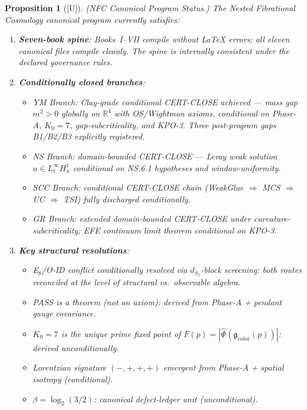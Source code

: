 \documentclass[12pt,oneside]{amsbook}
\theoremstyle{plain}
\newtheorem{proposition}[theorem]{Proposition}
\theoremstyle{definition}
\theoremstyle{remark}
\newcommand{\status}[1]{\textup{[#1]}}
\begin{document}
\begin{proposition}[\status{U}]\label{prop:program-status}
\textup{(NFC Canonical Program Status.)}
The Nested Fibrational Cosmology canonical program currently satisfies:
\begin{enumerate}[label=\textup{(\Roman*)}]
  \item \textbf{Seven-book spine}: Books~I--VII compile without
    LaTeX errors; all eleven canonical files compile cleanly.
    The spine is internally consistent under the declared
    governance rules.

  \item \textbf{Conditionally closed branches}:
    \begin{itemize}
      \item \emph{YM Branch}: Clay-grade conditional CERT-CLOSE
        achieved --- mass gap $m^2 > 0$ globally on $\mathbb{R}^4$
        with OS/Wightman axioms, conditional on Phase-A, $K_0=7$,
        gap-subcriticality, and KPO-3.  Three post-program gaps
        B1/B2/B3 explicitly registered.
      \item \emph{NS Branch}: domain-bounded CERT-CLOSE --- Leray
        weak solution $u \in L^\infty_t H^1_x$ conditional on
        NS.6.1 hypotheses and window-uniformity.
      \item \emph{SCC Branch}: conditional CERT-CLOSE chain
        (WeakGlue $\Rightarrow$ MCS $\Rightarrow$ UC $\Rightarrow$
        TSI) fully discharged conditionally.
      \item \emph{GR Branch}: extended domain-bounded CERT-CLOSE
        under curvature-subcriticality; EFE continuum limit
        theorem conditional on KPO-3.
    \end{itemize}

  \item \textbf{Key structural resolutions}:
    \begin{itemize}
      \item E$_8$/O-ID conflict conditionally resolved via
        $d_{S_v}$-block screening: both routes reconciled at
        the level of structural vs.\ observable algebra.
      \item PASS is a theorem (not an axiom): derived from
        Phase-A + pendant gauge covariance.
      \item $K_0 = 7$ is the unique prime fixed point of
        $F(p) = |\hat\Phi(\mathfrak{g}_{\mathrm{color}}(p))|$:
        derived unconditionally.
      \item Lorentzian signature $(-,+,+,+)$ emergent from
        Phase-A + spatial isotropy (conditional).
      \item $\beta = \log_2(3/2)$: canonical defect-ledger unit
        (unconditional).
    \end{itemize}


\end{enumerate}
\end{proposition}
\end{document}
